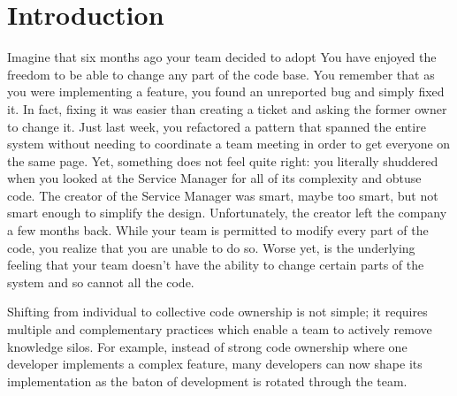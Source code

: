 \section{Introduction}
Imagine that six months ago your team decided to adopt  You have enjoyed the freedom to be able to change any part of the code base. You remember that as you were implementing a feature, you found an unreported bug and simply fixed it. In fact, fixing it was easier than creating a ticket and asking the former owner to change it. Just last week, you refactored a pattern that spanned the entire system without needing to coordinate a team meeting in order to get everyone on the same page. Yet, something does not feel quite right: you literally shuddered when you looked at the Service Manager for all of its complexity and obtuse code. The creator of the Service Manager was smart, maybe too smart, but not smart enough to simplify the design. Unfortunately, the creator left the company a few months back.  While your team is permitted to modify every part of the code, you realize that you are unable to do so. Worse yet, is the underlying feeling that your team doesn't have the ability to change certain parts of the system and so cannot  all the code.

Shifting from individual to collective code ownership is not simple; it requires multiple and complementary practices which enable a team to actively remove knowledge silos. For example, instead of strong code ownership where one developer implements a complex feature, many developers can now shape its implementation as the baton of development is rotated through the team. 




